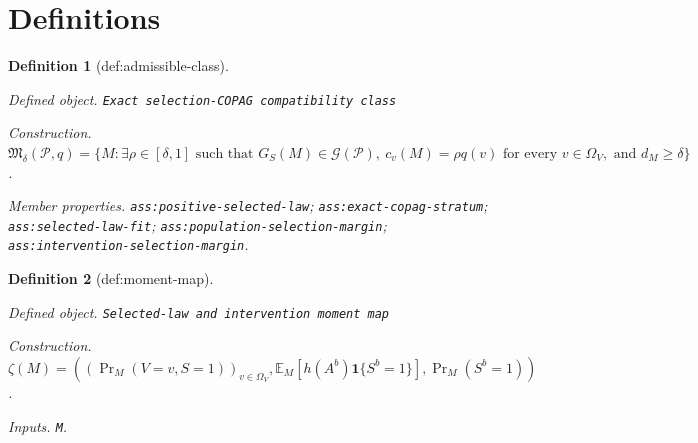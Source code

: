 \documentclass{article}
\newtheorem{definition}{Definition}
\begin{document}
\section{Definitions}

\begin{definition}[def:admissible-class]\label{def:admissible-class}
\par\smallskip\noindent\emph{Defined object.} \texttt{Exact selection-\allowbreak{}COPAG compatibility class}
\par\smallskip\noindent\emph{Construction.} \(\mathfrak M_\delta(\mathcal P,q)=\{M:\exists\rho\in[\delta,1]\text{ such that }G_S(M)\in\mathcal G(\mathcal P),\ c_v(M)=\rho q(v)\text{ for every }v\in\Omega_V,\text{ and }d_M\ge\delta\}\).
\par\smallskip\noindent\emph{Member properties.} \texttt{ass:\allowbreak{}positive-\allowbreak{}selected-\allowbreak{}law}; \texttt{ass:\allowbreak{}exact-\allowbreak{}copag-\allowbreak{}stratum}; \texttt{ass:\allowbreak{}selected-\allowbreak{}law-\allowbreak{}fit}; \texttt{ass:\allowbreak{}population-\allowbreak{}selection-\allowbreak{}margin}; \texttt{ass:\allowbreak{}intervention-\allowbreak{}selection-\allowbreak{}margin}.
\end{definition}

\begin{definition}[def:moment-map]\label{def:moment-map}
\par\smallskip\noindent\emph{Defined object.} \texttt{Selected-\allowbreak{}law and intervention moment map}
\par\smallskip\noindent\emph{Construction.} \(\zeta(M)=((\Pr_M(V=v,S=1))_{v\in\Omega_V},\mathbb E_M[h(A^b)\mathbf 1\{S^b=1\}],\Pr_M(S^b=1))\).
\par\smallskip\noindent\emph{Inputs.} \texttt{M}.
\end{definition}
\end{document}

